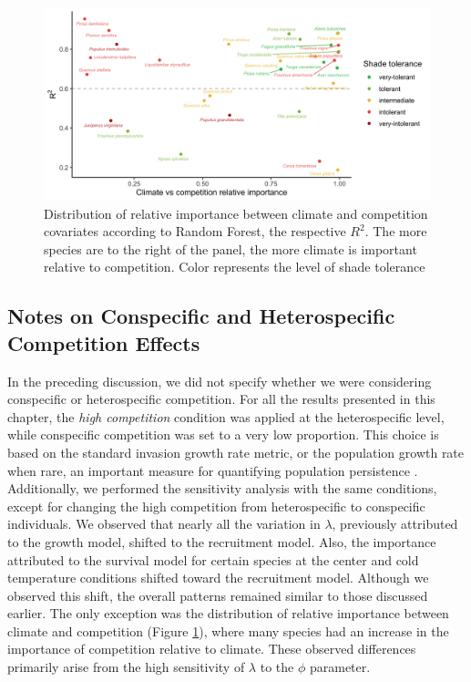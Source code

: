 \hypertarget{fig:climVsComp}{%
\begin{figure}
\centering
\includegraphics{manuscript/figs/fig-climVsComp-1.png}
\caption[{Distribution of relative importance between climate and
competition covariates according to Random Forest, the respective
\(R^2\).}]{Distribution of relative importance between climate and
competition covariates according to Random Forest, the respective
\(R^2\). The more species are to the right of the panel, the more
climate is important relative to competition. Color represents the level
of shade tolerance \citep{burns1990silvics}}
\label{fig:climVsComp}
\end{figure}
}

\hypertarget{notes-on-conspecific-and-heterospecific-competition-effects}{%
\subsection{Notes on Conspecific and Heterospecific Competition
Effects}\label{notes-on-conspecific-and-heterospecific-competition-effects}}

In the preceding discussion, we did not specify whether we were
considering conspecific or heterospecific competition. For all the
results presented in this chapter, the \emph{high competition} condition
was applied at the heterospecific level, while conspecific competition
was set to a very low proportion. This choice is based on the standard
invasion growth rate metric, or the population growth rate when rare, an
important measure for quantifying population persistence
\citep{lewontin1969}.\\

Additionally, we performed the sensitivity analysis with the same
conditions, except for changing the high competition from heterospecific
to conspecific individuals. We observed that nearly all the variation in
\(\lambda\), previously attributed to the growth model, shifted to the
recruitment model. Also, the importance attributed to the survival model
for certain species at the center and cold temperature conditions
shifted toward the recruitment model. Although we observed this shift,
the overall patterns remained similar to those discussed earlier. The
only exception was the distribution of relative importance between
climate and competition (Figure \ref{fig:climVsComp}), where many
species had an increase in the importance of competition relative to
climate. These observed differences primarily arise from the high
sensitivity of \(\lambda\) to the \(\phi\) parameter.\\

\singlespacing
{\renewcommand{\bibname}{References}
\renewcommand{\bibsection}{\section{\bibname}}
}

